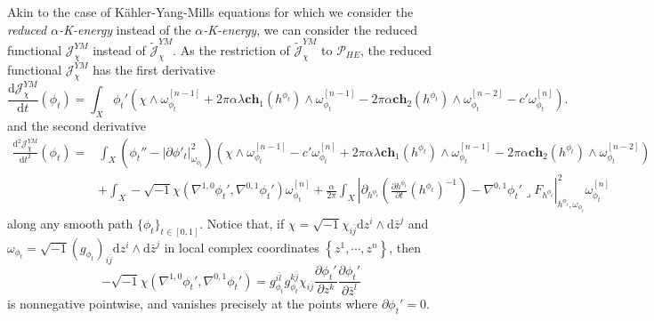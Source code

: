 \documentclass[10pt, letterpaper]{amsart}
\newcommand{\tr}{\operatorname{tr}}
\theoremstyle{plain}
\theoremstyle{definition}
\numberwithin{equation}{section}
\begin{document}
Akin to the case of K\"ahler-Yang-Mills equations for which we consider the \emph{reduced $\alpha$-K-energy} instead of the \emph{$\alpha$-K-energy}, we can consider the reduced functional $\mathcal{J}_\chi^{YM}$ instead of $\widetilde{\mathcal{J}}_\chi^{YM}$. As the restriction of $\widetilde{\mathcal{J}}_\chi^{YM}$ to $\mathcal{P}_{HE}$, the reduced functional $\mathcal{J}_\chi^{YM}$ has the first derivative
\begin{equation}
    \frac{\mathrm{d} \mathcal{J}_\chi^{YM}}{\mathrm{d}t}\left(\phi_t\right)
    = 
    \int_X \phi_t'\left( 
    \chi\wedge \omega_{\phi_t}^{[n-1]}
    + 
    2\pi\alpha\lambda \mathbf{ch}_1\left(h^{\phi_t}\right)\wedge \omega_{\phi_t}^{[n-1]}
    -
    2\pi\alpha \mathbf{ch}_2\left(h^{\phi_t}\right)\wedge\omega_{\phi_t}^{[n-2]}
    -
    c'\omega_{\phi_t}^{[n]}
    \right).
\end{equation}
and the second derivative
\begin{equation}
\begin{split}
   \frac{\mathrm{d}^2 \mathcal{J}_\chi^{YM}}{\mathrm{d}t^2}\left(\phi_t\right)
   =
	& \int_X \left(\phi_t''-\left|\partial \phi'_t\right|_{\omega_{\phi_t}}^2\right) \left(
	\chi\wedge\omega_{\phi_t}^{[n-1]}-c'\omega_{\phi_t}^{[n]} 
	+ 
	2\pi\alpha\lambda \mathbf{ch}_1\left(h^{\phi_t}\right)\wedge\omega_{\phi_t}^{[n-1]}
 -
 2\pi \alpha \mathbf{ch}_2\left(h^{\phi_t}\right)\wedge \omega_{\phi_t}^{[n-2]}
	\right)\\
	& + 
    \int_X -\sqrt{-1}\chi\left(\nabla^{1,0}\phi_t', \nabla^{0,1}\phi_t'\right)\omega_{\phi_t}^{[n]}
	+
	\frac{\alpha}{2\pi}\int_X\left| \partial_{h^{\phi_t}} \left(\frac{\partial h^{\phi_t}}{\partial t}\left(h^{\phi_t}\right)^{-1}\right)-\nabla^{0,1}\phi_t'\lrcorner F_{h^{\phi_t}}\right|_{h^{\phi_t},\omega_{\phi_t}}^2\omega_{\phi_t}^{[n]}
	\end{split}
    \label{J-chi-YM}
	\end{equation}
along any smooth path $\{\phi_t\}_{t\in [0,1]}$. Notice that, if $\chi=\sqrt{-1}\chi_{i\bar j}\mathrm{d}z^i\wedge \mathrm{d}\bar z^j$ and $\omega_{\phi_t}=\sqrt{-1}\left(g_{\phi_t}\right)_{i\bar j}\mathrm{d}z^i\wedge \mathrm{d}\bar z^j$ in local complex coordinates $\left\{z^1, \cdots, z^n\right\}$, then
\[
-\sqrt{-1}\chi\left(\nabla^{1,0}\phi_t', \nabla^{0,1}\phi_t'\right)
= 
g_{\phi_t}^{i\bar l}g_{\phi_t}^{k\bar j}\chi_{i\bar j}\frac{\partial\phi_t'}{\partial z^k} \frac{\partial \phi_t'}{\partial \bar z^l}
\]
is nonnegative pointwise, and vanishes precisely at the points where $\partial \phi_t'=0$.\\
\end{document}
